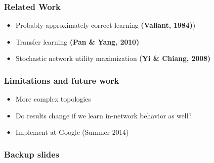 \documentclass[svgnames]{beamer}
\begin{document}
\begin{Large}













\begin{frame}
\frametitle{Related Work}
\begin{itemize}
\item Probably approximately correct learning \textbf{(Valiant, 1984)})
\item Transfer learning \textbf{(Pan \& Yang, 2010)}
\item Stochastic network utility maximization \textbf{(Yi \& Chiang, 2008)}
\end{itemize}
\end{frame}

\begin{frame}
\frametitle{Limitations and future work}
\begin{itemize}
\item More complex topologies
\item Do results change if we learn in-network behavior as well?
\item Implement at Google (Summer 2014)
\end{itemize}
\end{frame}
\end{Large}

\begin{frame}
\frametitle{Backup slides}
\end{frame}

\end{document}
